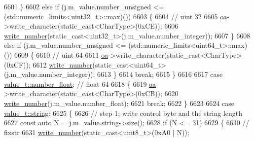 \begin{DoxyCode}
6601                 \}
6602                 \textcolor{keywordflow}{else} \textcolor{keywordflow}{if} (j.m\_value.number\_unsigned <= (std::numeric\_limits<uint32\_t>::max)())
6603                 \{
6604                     \textcolor{comment}{// uint 32}
6605                     \hyperlink{classnlohmann_1_1detail_1_1binary__writer_a6f15b782a7900f50ef37d123008e601b}{oa}->write\_character(static\_cast<CharType>(0xCE));
6606                     \hyperlink{classnlohmann_1_1detail_1_1binary__writer_a62cfd50a511371e718f37ad7bb29ae9d}{write\_number}(static\_cast<uint32\_t>(j.m\_value.number\_integer));
6607                 \}
6608                 \textcolor{keywordflow}{else} \textcolor{keywordflow}{if} (j.m\_value.number\_unsigned <= (std::numeric\_limits<uint64\_t>::max)())
6609                 \{
6610                     \textcolor{comment}{// uint 64}
6611                     \hyperlink{classnlohmann_1_1detail_1_1binary__writer_a6f15b782a7900f50ef37d123008e601b}{oa}->write\_character(static\_cast<CharType>(0xCF));
6612                     \hyperlink{classnlohmann_1_1detail_1_1binary__writer_a62cfd50a511371e718f37ad7bb29ae9d}{write\_number}(static\_cast<uint64\_t>(j.m\_value.number\_integer));
6613                 \}
6614                 \textcolor{keywordflow}{break};
6615             \}
6616 
6617             \textcolor{keywordflow}{case} \hyperlink{namespacenlohmann_1_1detail_a1ed8fc6239da25abcaf681d30ace4985ad9966ecb59667235a57b4b999a649eef}{value\_t::number\_float}: \textcolor{comment}{// float 64}
6618             \{
6619                 \hyperlink{classnlohmann_1_1detail_1_1binary__writer_a6f15b782a7900f50ef37d123008e601b}{oa}->write\_character(static\_cast<CharType>(0xCB));
6620                 \hyperlink{classnlohmann_1_1detail_1_1binary__writer_a62cfd50a511371e718f37ad7bb29ae9d}{write\_number}(j.m\_value.number\_float);
6621                 \textcolor{keywordflow}{break};
6622             \}
6623 
6624             \textcolor{keywordflow}{case} \hyperlink{namespacenlohmann_1_1detail_a1ed8fc6239da25abcaf681d30ace4985ab45cffe084dd3d20d928bee85e7b0f21}{value\_t::string}:
6625             \{
6626                 \textcolor{comment}{// step 1: write control byte and the string length}
6627                 \textcolor{keyword}{const} \textcolor{keyword}{auto} N = j.m\_value.string->size();
6628                 \textcolor{keywordflow}{if} (N <= 31)
6629                 \{
6630                     \textcolor{comment}{// fixstr}
6631                     \hyperlink{classnlohmann_1_1detail_1_1binary__writer_a62cfd50a511371e718f37ad7bb29ae9d}{write\_number}(static\_cast<uint8\_t>(0xA0 | N));

\end{DoxyCode}
